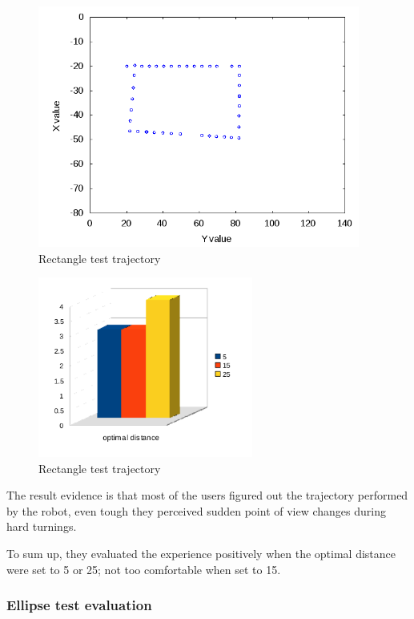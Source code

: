 %
\begin{figure}[!h]
  \begin{center}
    \includegraphics[width=300pt]{img/path_session_9.png}
    \caption{Rectangle test trajectory}
    \label{fig:rectangletest}
  \end{center}
\end{figure}
%
\begin{figure}[!h]
  \begin{center}
    \includegraphics[width=200pt]{img/square.png}
    \caption{Rectangle test trajectory}
  \end{center}
\end{figure}
%

The result evidence is that most of the users figured out the
trajectory performed by the robot, even tough they perceived
sudden point of view changes during hard turnings.
%

%
To sum up, they evaluated the experience positively when the
optimal distance were set to 5 or 25; not too comfortable
when set to 15.


\subsubsection{Ellipse test evaluation}
\label{subsubsec:ellipsetest}

